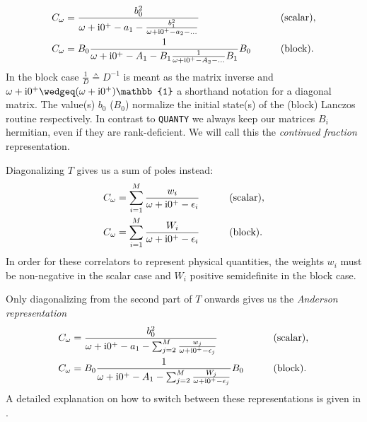 \begin{subequations}
    \begin{align}
        C_\omega
         & =
        \frac{b_0^2}{\omega + \mathrm{i}0^+ - a_1 - \frac{b_1^2}{\omega + \mathrm{i}0^+ - a_2 - \ldots}}
        \qquad
         &
         & \text{(scalar)},                                                                         \\
        C_\omega
         & = B_0\frac{1}{\omega + \mathrm{i}0^+ - A_1 - B_1\frac{1}{\omega + \mathrm{i}0^+ - A_2 - \ldots}B_1}B_0
        \qquad
         &
         & \text{(block)}.
    \end{align}
\end{subequations}
In the block case $\frac{1}{D} \wedgeq D^{-1}$ is meant as the matrix inverse
and $\omega + \mi0^+ \wedgeq (\omega + \mi0^+)\mathbb{1}$ a shorthand notation
for a diagonal matrix.
The value(s) $b_0$ ($B_0$) normalize the initial state(s) of
the (block) Lanczos routine respectively.
In contrast to \texttt{QUANTY} \cite{Ackermann2024} we always keep our matrices $B_i$ hermitian,
even if they are rank-deficient.
We will call this the \emph{continued fraction} representation.

Diagonalizing $T$ gives us a sum of poles instead:
\begin{subequations}
    \begin{align}
        C_\omega
         & =
        \sum_{i=1}^M \frac{w_i}{\omega + \mathrm{i}0^+ - \epsilon_i}
        \label{eq:correlator-sum}
        \qquad
         &   & \text{(scalar)}, \\
        C_\omega
         & =
        \sum_{i=1}^M \frac{W_i}{\omega + \mathrm{i}0^+ - \epsilon_i}
        \qquad
         &   & \text{(block)}.
    \end{align}
\end{subequations}
In order for these correlators to represent physical quantities,
the weights $w_i$ must be non-negative in the scalar case
and $W_i$ positive semidefinite in the block case.

Only diagonalizing from the second part of $T$ onwards gives us the \emph{Anderson representation}
\begin{subequations}
    \begin{align}
        C_\omega
         & =
        \frac{b_0^2}{\omega + \mathrm{i}0^+ - a_1 - \sum_{j=2}^M \frac{w_j}{\omega + \mathrm{i}0^+ - \epsilon_j}}
        \qquad
         &
         &
        \text{(scalar)},                                                                                   \\
        C_\omega
         & = B_0\frac{1}{\omega + \mathrm{i}0^+ - A_1 - \sum_{j=2}^M \frac{W_j}{\omega + \mathrm{i}0^+ - \epsilon_j}}B_0
        \qquad
         &
         &
        \text{(block)}.
        \label{eq:correlator-anderson-block}
    \end{align}
\end{subequations}
A detailed explanation on how to switch between these representations is given in \cite{Lu2014}.

